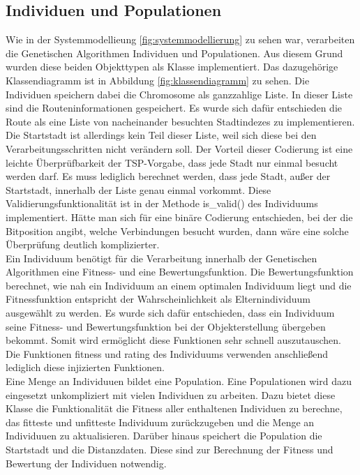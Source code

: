 \subsection{Individuen und Populationen}
Wie in der Systemmodellieung \ref{fig:systemmodellierung} zu sehen war, verarbeiten die Genetischen Algorithmen Individuen und Populationen. Aus diesem Grund wurden diese beiden Objekttypen als Klasse implementiert. Das dazugehörige Klassendiagramm ist in Abbildung \ref{fig:klassendiagramm} zu sehen.
Die Individuen speichern dabei die Chromosome als ganzzahlige Liste. In dieser Liste sind die Routeninformationen gespeichert. Es wurde sich dafür entschieden die Route als eine Liste von nacheinander besuchten Stadtindezes zu implementieren. Die Startstadt ist allerdings kein Teil dieser Liste, weil sich diese bei den Verarbeitungsschritten nicht verändern soll.
Der Vorteil dieser Codierung ist eine leichte Überprüfbarkeit der TSP-Vorgabe, dass jede Stadt nur einmal besucht werden darf. Es muss lediglich berechnet werden, dass jede Stadt, außer der Startstadt, innerhalb der Liste genau einmal vorkommt. Diese Validierungsfunktionalität ist in der Methode is\_valid() des Individuums implementiert.
Hätte man sich für eine binäre Codierung entschieden, bei der die Bitposition angibt, welche Verbindungen besucht wurden, dann wäre eine solche Überprüfung deutlich komplizierter.\\
Ein Individuum benötigt für die Verarbeitung innerhalb der Genetischen Algorithmen eine Fitness- und eine Bewertungsfunktion. Die Bewertungsfunktion berechnet, wie nah ein Individuum an einem optimalen Individuum liegt und die Fitnessfunktion entspricht der Wahrscheinlichkeit als Elternindividuum ausgewählt zu werden.
Es wurde sich dafür entschieden, dass ein Individuum seine Fitness- und Bewertungsfunktion bei der Objekterstellung übergeben bekommt. Somit wird ermöglicht diese Funktionen sehr schnell auszutauschen. Die Funktionen fitness und rating des Individuums verwenden anschließend lediglich diese injizierten Funktionen.\\
Eine Menge an Individuuen bildet eine Population. Eine Populationen wird dazu eingesetzt unkompliziert mit vielen Individuen zu arbeiten. Dazu bietet diese Klasse die Funktionalität die Fitness aller enthaltenen Individuen zu berechne, das fitteste und unfitteste Individuum zurückzugeben und die Menge an Individuuen zu aktualisieren.
Darüber hinaus speichert die Population die Startstadt und die Distanzdaten. Diese sind zur Berechnung der Fitness und Bewertung der Individuen notwendig.

